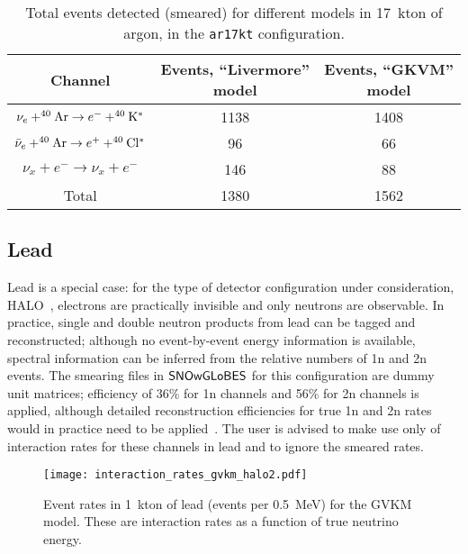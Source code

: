 \documentclass[12pt]{article}
\newcommand{\snowglobes}{\sf{SNOwGLoBES}}
\begin{document}
\begin{table}[h]
\centering
\begin{tabular}{|c|c|c|} \hline
Channel & Events, ``Livermore'' model & Events, ``GKVM'' model  \\
\hline

$\nu_e + ^{40}{\rm Ar} \rightarrow e^- + ^{40}{\rm K^*}$ & 1138  & 1408 \\

$\bar{\nu}_e + ^{40}{\rm Ar} \rightarrow e^+ + ^{40}{\rm Cl^*}$ & 96& 66\\

$\nu_x + e^- \rightarrow \nu_x + e^-$                           & 146 &   88\\

\hline

Total &  1380 & 1562 \\ \hline
\end{tabular}
\caption{Total events detected (smeared) for different models in 17~kton of argon, in the \texttt{ar17kt} configuration.}
\label{tab:lartable}
\end{table}



\subsection{Lead}

Lead is a special case: for the type of detector configuration under
consideration, HALO~\cite{Duba:2008zz}, electrons are practically invisible
and only neutrons are observable.  In practice, single and double
neutron products from lead can be tagged and reconstructed; although
no event-by-event energy information is available, spectral information can be
inferred from the relative numbers of 1n and 2n events.  The smearing
files in $\snowglobes$ for this configuration are dummy unit matrices;
efficiency of 36\% for 1n channels and 56\% for 2n channels is
applied, although detailed reconstruction efficiencies for true 1n and
2n rates would in practice need to be applied~\cite{halo}.  The user is
advised to make use only of interaction rates for these channels in
lead and to ignore the smeared rates.

\begin{figure}[htb]
  \centering\texttt{[image: interaction\_rates\_gvkm\_halo2.pdf]}

  \caption{Event rates in 1~kton of lead (events per 0.5~MeV) for the GVKM model. These
    are interaction rates as a function of true neutrino energy.}
  \label{fig:leadrates}
\end{figure}
\end{document}
